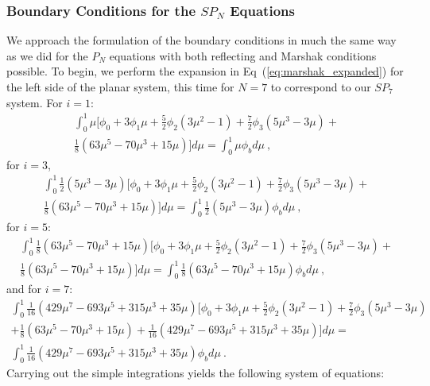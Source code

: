 \documentclass[letterpaper,12pt]{article}
\begin{document}
\subsubsection{Boundary Conditions for the $SP_N$ Equations}
\label{subsubsec:spn_boundary_conditions}
We approach the formulation of the boundary conditions in much the
same way as we did for the $P_N$ equations with both reflecting and
Marshak conditions possible. To begin, we perform the expansion in
Eq~(\ref{eq:marshak_expanded}) for the left side of the planar system,
this time for $N=7$ to correspond to our $SP_7$ system. For $i=1$:
\begin{multline}
  \int_0^1 \mu \Bigg[ \phi_0 + 3\phi_1\mu +
    \frac{5}{2}\phi_2(3\mu^2-1) + \frac{7}{2}\phi_3(5\mu^3-3\mu)
    +\\ \frac{1}{8}(63\mu^5-70\mu^3+15\mu) \Bigg] d\mu = \int_0^1 \mu
  \phi_b d\mu\:,
  \label{eq:spn_bnd_p1}
\end{multline}
for $i=3$,
\begin{multline}
  \int_0^1 \frac{1}{2}(5\mu^3-3\mu) \Bigg[ \phi_0 + 3\phi_1\mu +
    \frac{5}{2}\phi_2(3\mu^2-1) + \frac{7}{2}\phi_3(5\mu^3-3\mu) +\\
    \frac{1}{8}(63\mu^5-70\mu^3+15\mu) \Bigg] d\mu = \int_0^1
  \frac{1}{2}(5\mu^3-3\mu) \phi_b d\mu\:,
  \label{eq:spn_bnd_p3}
\end{multline}
for $i=5$:
\begin{multline}
  \int_0^1 \frac{1}{8}(63\mu^5-70\mu^3+15\mu) \Bigg[ \phi_0 + 3\phi_1\mu +
    \frac{5}{2}\phi_2(3\mu^2-1) + \frac{7}{2}\phi_3(5\mu^3-3\mu) +\\
    \frac{1}{8}(63\mu^5-70\mu^3+15\mu) \Bigg] d\mu = \int_0^1
  \frac{1}{8}(63\mu^5-70\mu^3+15\mu) \phi_b d\mu\:,
  \label{eq:spn_bnd_p5}
\end{multline}
and for $i=7$:
\begin{multline}
  \int_0^1 \frac{1}{16}(429\mu^7-693\mu^5+315\mu^3+35\mu) \Bigg[
    \phi_0 + 3\phi_1\mu + \frac{5}{2}\phi_2(3\mu^2-1) +
    \frac{7}{2}\phi_3(5\mu^3-3\mu) \\+
    \frac{1}{8}(63\mu^5-70\mu^3+15\mu) +
    \frac{1}{16}(429\mu^7-693\mu^5+315\mu^3+35\mu) \Bigg] d\mu =\\
  \int_0^1 \frac{1}{16}(429\mu^7-693\mu^5+315\mu^3+35\mu) \phi_b
  d\mu\:.
  \label{eq:spn_bnd_p7}
\end{multline}
Carrying out the simple integrations yields the following system of
equations:
\end{document}
